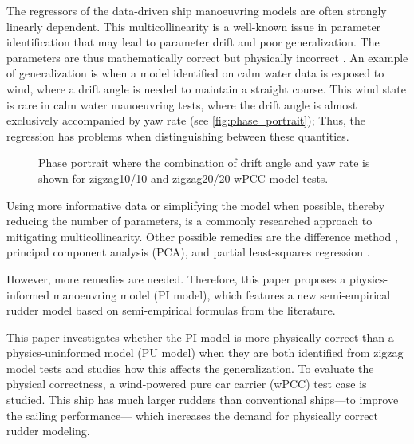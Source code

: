 %
The regressors of the data-driven ship manoeuvring models are often strongly linearly dependent. This multicollinearity is a well-known issue in parameter identification that may lead to parameter drift and poor generalization. The parameters are thus mathematically correct but physically incorrect \citep{luo_parameter_2016-1}. 
An example of generalization is when a model identified on calm water data is exposed to wind, where a drift angle is needed to maintain a straight course. This wind state is rare in calm water manoeuvring tests, where the drift angle is almost exclusively accompanied by yaw rate (see \autoref{fig:phase_portrait}); 
Thus, the regression has problems when distinguishing between these quantities.
%
\begin{figure}[h]
  \centering
  
  \caption{Phase portrait where the combination of drift angle and yaw rate is shown for zigzag10/10 and zigzag20/20 wPCC model tests.}
  \label{fig:phase_portrait}
\end{figure}
Using more informative data or simplifying the model when possible, thereby reducing the number of parameters, is a commonly researched approach to mitigating multicollinearity. Other possible remedies are the difference method \citep{luo_parameter_2016-1}, principal component analysis (PCA), and partial least-squares regression \citep{jian-chuan_parametric_2015}. 

However, more remedies are needed. Therefore, this paper proposes a physics-informed manoeuvring model (PI model), which features a new semi-empirical rudder model based on semi-empirical formulas from the literature.

This paper investigates whether the PI model is more physically correct than a physics-uninformed model (PU model) when they are both identified from zigzag model tests and studies how this affects the generalization.
To evaluate the physical correctness, a wind-powered pure car carrier (wPCC) test case is studied. 
This ship has much larger rudders than conventional ships---to improve the sailing performance---
which increases the demand for physically correct rudder modeling.

